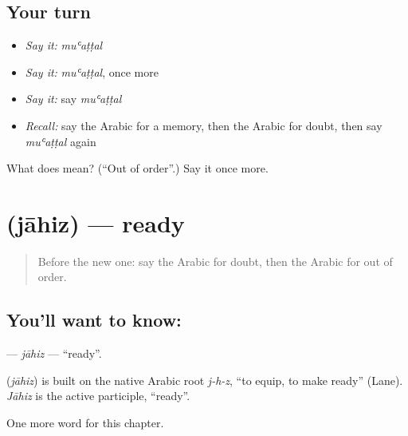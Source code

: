 \subsection*{Your turn}
\begin{itemize}
\raggedright
  \item \emph{Say it:} \emph{muʿaṭṭal}
  \item \emph{Say it:} \emph{muʿaṭṭal}, once more
  \item \emph{Say it:} say \emph{muʿaṭṭal}
  \item \emph{Recall:} say the Arabic for a memory, then the Arabic for doubt, then say \emph{muʿaṭṭal} again
\end{itemize}

\begin{tcolorbox}[breakable,colback=teal!4,colframe=teal!35!black,title={Before you move on}]
What does  mean? (\textquotedblleft{}Out of order\textquotedblright{}.) Say it once more.
\end{tcolorbox}
\section[\texorpdfstring{\ar{جاهز} (jāhiz)}{جاهز (jāhiz)}]{ (jāhiz) — ready}

\label{lesson:AR-C240-jahiz}



\begin{quote}
Before the new one: say the Arabic for doubt, then the Arabic for out of order.
\end{quote}

\subsection*{You'll want to know: }
\textbf{} — \emph{jāhiz} — \textquotedblleft{}ready\textquotedblright{}.

\begin{cousinweb}
\textbf{} (\emph{jāhiz}) is built on the native Arabic root \emph{j-h-z}, \textquotedblleft{}to equip, to make ready\textquotedblright{} (Lane). \emph{Jāhiz} is the active participle, \textquotedblleft{}ready\textquotedblright{}.
\end{cousinweb}

\begin{grammarlens}[title={What you've built}]
One more word for this chapter.
\end{grammarlens}

